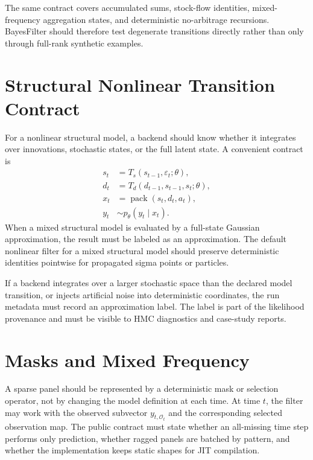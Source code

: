 The same contract covers accumulated sums, stock-flow identities,
mixed-frequency aggregation states, and deterministic no-arbitrage recursions.
BayesFilter should therefore test degenerate transitions directly rather than
only through full-rank synthetic examples.

\section{Structural Nonlinear Transition Contract}
\label{sec:bf-structural-nonlinear-transition-contract}

For a nonlinear structural model, a backend should know whether it integrates
over innovations, stochastic states, or the full latent state.  A convenient
contract is
\begin{align}
  s_t &= T_s(s_{t-1},\varepsilon_t;\theta),\\
  d_t &= T_d(d_{t-1},s_{t-1},s_t;\theta),\\
  x_t &= \operatorname{pack}(s_t,d_t,a_t),\\
  y_t &\sim p_\theta(y_t\mid x_t).
\end{align}
When a mixed structural model is evaluated by a full-state Gaussian
approximation, the result must be labeled as an approximation.  The default
nonlinear filter for a mixed structural model should preserve deterministic
identities pointwise for propagated sigma points or particles.

\begin{assumption}
\label{asm:bf-approximation-labeling}
If a backend integrates over a larger stochastic space than the declared model
transition, or injects artificial noise into deterministic coordinates, the
run metadata must record an approximation label.  The label is part of the
likelihood provenance and must be visible to HMC diagnostics and case-study
reports.
\end{assumption}

\section{Masks and Mixed Frequency}
\label{sec:bf-masks-mixed-frequency-contract}

A sparse panel should be represented by a deterministic mask or selection
operator, not by changing the model definition at each time.  At time $t$, the
filter may work with the observed subvector $y_{t,\mathcal{O}_t}$ and the
corresponding selected observation map.  The public contract must state whether
an all-missing time step performs only prediction, whether ragged panels are
batched by pattern, and whether the implementation keeps static shapes for JIT
compilation.

